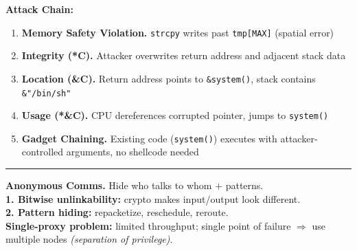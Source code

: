 \documentclass[9pt, a4paper]{extarticle}
\makeatletter
\renewcommand{\hline}{\noalign{\vskip 2px}\hrule\@height\arrayrulewidth\@width\linewidth\noalign{\vskip 2px}}
\makeatother
\begin{document}
\begin{minipage}[t]{0.495\textwidth}
\begin{minipage}[t]{0.495\textwidth}
		\hspace*{-30px}\vline
		\begin{minipage}[htp]{1.23\textwidth}
			\textbf{Attack Chain:}
			\begin{enumerate}[leftmargin=6px, labelsep=0px]
				\item \textbf{Memory Safety Violation.} \texttt{strcpy} writes past \texttt{tmp[MAX]} (spatial error)
				\item \textbf{Integrity (*C).} Attacker overwrites return address and adjacent stack data
				\item \textbf{Location (\&C).} Return address points to \texttt{\&system()}, stack contains \texttt{\&"/bin/sh"}
				\item \textbf{Usage (*\&C).} CPU dereferences corrupted pointer, jumps to \texttt{system()}
				\item \textbf{Gadget Chaining.} Existing code (\texttt{system()}) executes with attacker-controlled arguments, no shellcode needed
			\end{enumerate}
			\scriptsize
			\hline
			\textbf{Anonymous Comms.} Hide who talks to whom + patterns.\\
			\textbf{1. Bitwise unlinkability:} crypto makes input/output look different.\\
			\textbf{2. Pattern hiding:} repacketize, reschedule, reroute.\\
			\textbf{Single-proxy problem:} limited throughput; single point of failure $\Rightarrow$ use multiple nodes \textit{(separation of privilege)}.
		\end{minipage}
	\end{minipage}
\end{minipage}
\hfill
\end{document}

